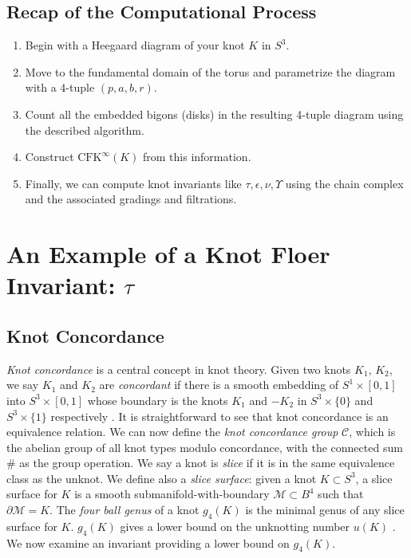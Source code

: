 \documentclass[reqno, 12pt]{amsart}
\theoremstyle{remark}
\begin{document}
\subsection{Recap of the Computational Process}
	\begin{enumerate}
		\item Begin with a Heegaard diagram of your knot $K$ in $S^3$.
		\item Move to the fundamental domain of the torus and parametrize the diagram with a 4-tuple $(p, a, b, r)$.
		\item Count all the embedded bigons (disks) in the resulting 4-tuple diagram using the described algorithm.
		\item Construct $\text{CFK}^{\infty}(K)$ from this information.
		\item Finally, we can compute knot invariants like $\tau, \epsilon, \nu, \Upsilon$ using the chain complex and  the associated gradings and filtrations.
	\end{enumerate}

\section{An Example of a Knot Floer Invariant: $\tau$}
\subsection{Knot Concordance}
\textit{Knot concordance} is a central concept in knot theory. Given two knots $K_1$, $K_2$, we say $K_1$ and $K_2$ are \textit{concordant} if there is a smooth embedding of $S^1 \times [0,1]$ into $S^3 \times [0,1]$ whose boundary is the knots $K_1$ and $-K_2$ in $S^3 \times \{0\}$ and $S^3 \times \{1\}$ respectively \cite[Section~1]{livingston2004surveyclassicalknotconcordance}. It is straightforward to see that knot concordance is an equivalence relation. We can now define the \textit{knot concordance group} $\mathcal{C}$, which is the abelian group of all knot types modulo concordance, with the connected sum $\#$ as the group operation. We say a knot is \textit{slice} if it is in the same equivalence class as the unknot. We define also a \textit{slice surface}: given a knot $K \subset S^3$, a slice surface for $K$ is a smooth submanifold-with-boundary $\mathcal{M} \subset B^4$ such that $\partial \mathcal{M} = K$. The \textit{four ball genus} of a knot $g_4(K)$ is the minimal genus of any slice surface for $K$. $g_4(K)$ gives a lower bound on the unknotting number $u(K)$ \cite[Section~1]{Ozsv_th_2003}. We now examine an invariant providing a lower bound on $g_4(K)$.
\end{document}
